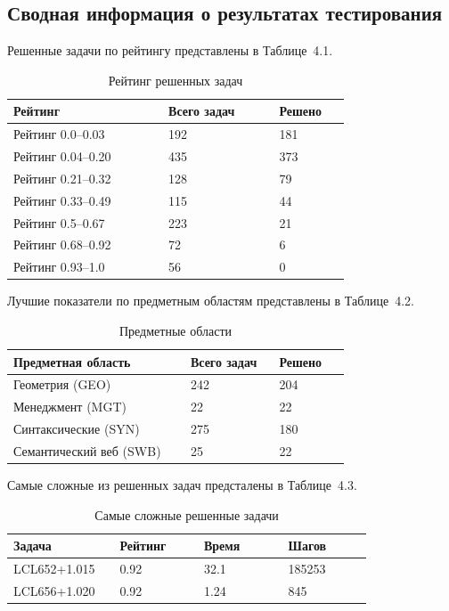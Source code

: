 \subsection{Сводная информация о результатах тестирования}

Решенные задачи по рейтингу представлены в Таблице~4.1.

\begin{longtable}[H]{|p{0.35\linewidth}|p{0.25\linewidth}|p{0.15\linewidth}|}
\caption{Рейтинг решенных задач}\\
\hline
\textbf{Рейтинг} & \textbf{Всего задач} & \textbf{Решено} \\
\hline
Рейтинг 0.0--0.03 & 192 & 181 \\
\hline
Рейтинг 0.04--0.20 & 435 & 373 \\
\hline
Рейтинг 0.21--0.32 & 128 & 79 \\
\hline
Рейтинг 0.33--0.49 & 115 & 44 \\
\hline
Рейтинг 0.5--0.67 & 223 & 21 \\
\hline
Рейтинг 0.68--0.92 & 72 & 6 \\
\hline
Рейтинг 0.93--1.0 & 56 & 0\\
\hline
\end{longtable}


Лучшие показатели по предметным областям представлены в Таблице~4.2.

\begin{longtable}[H]{|p{0.4\linewidth}|p{0.2\linewidth}|p{0.15\linewidth}|}
\caption{Предметные области}\\
\hline
\textbf{Предметная область} & \textbf{Всего задач} & \textbf{Решено} \\
\hline
Геометрия (GEO) & 242 & 204 \\
\hline
Менеджмент (MGT) & 22 & 22 \\
\hline
Синтаксические (SYN) & 275 & 180 \\
\hline
Семантический веб (SWB) & 25 & 22 \\
\hline
\end{longtable}


Самые сложные из решенных задач предсталены в Таблице~4.3.

\begin{longtable}[H]{|p{0.2\linewidth}|p{0.2\linewidth}|p{0.2\linewidth}|p{0.2\linewidth}|}
\caption{Самые сложные решенные задачи}\\
\hline
\textbf{Задача} & \textbf{Рейтинг} & \textbf{Время} & \textbf{Шагов} \\
\hline
LCL652+1.015 & 0.92 & 32.1 & 185253 \\
\hline
LCL656+1.020 & 0.92 & 1.24 & 845 \\
\hline
\end{longtable}



